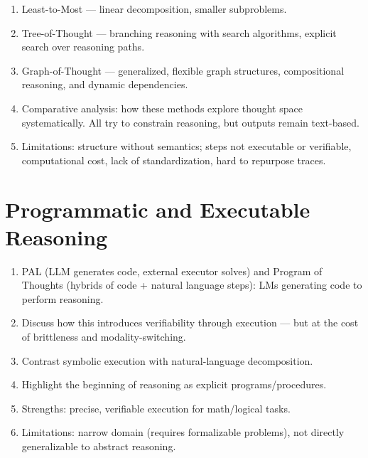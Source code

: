 \documentclass[project]{bsu-cs}  %
\begin{document}
\begin{enumerate}
    \item Least-to-Most \citep{zhou2023leasttomostpromptingenablescomplex} — linear decomposition, smaller subproblems.

    \item Tree-of-Thought \citep{yao2023treethoughtsdeliberateproblem} — branching reasoning with search algorithms, explicit search over reasoning paths.

    \item Graph-of-Thought \citep{Besta_2024} — generalized, flexible graph structures, compositional reasoning, and dynamic dependencies.

    \item Comparative analysis: how these methods explore thought space systematically. All try to constrain reasoning, but outputs remain text-based.

    \item Limitations: structure without semantics; steps not executable or verifiable, computational cost, lack of standardization, hard to repurpose traces.

\end{enumerate}
% 
%
%
% 
\section{Programmatic and Executable Reasoning}\label{sec:programmatic}
\begin{enumerate}
    \item PAL \citep{gao2023palprogramaidedlanguagemodels} (LLM generates code, external executor solves) and Program of Thoughts \citep{chen2023programthoughtspromptingdisentangling} (hybrids of code + natural language steps): LMs generating code to perform reasoning.

    \item Discuss how this introduces verifiability through execution — but at the cost of brittleness and modality-switching.

    \item Contrast symbolic execution with natural-language decomposition.

    \item Highlight the beginning of reasoning as explicit programs/procedures.

    \item Strengths: precise, verifiable execution for math/logical tasks.

    \item Limitations: narrow domain (requires formalizable problems), not directly generalizable to abstract reasoning.

\end{enumerate}
\end{document}
